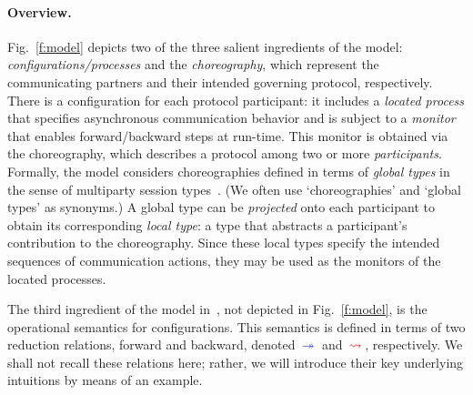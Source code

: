 \documentclass[runningheads,plain]{llncs}
\begin{document}
\paragraph{Overview.}
Fig.~\ref{f:model} depicts two of the three salient ingredients of the model:
\emph{configurations/processes} and the
\emph{choreography}, which represent the communicating partners and their intended governing protocol, respectively. 
There is a {configuration} for each protocol participant: it includes a \emph{located process} that specifies asynchronous communication behavior and is subject to a \emph{monitor} that enables forward/backward steps at run-time. This monitor is obtained via the choreography, which describes a protocol among two or more \emph{participants}. 
Formally, the model considers choreographies defined in terms of \emph{global types} in the sense of multiparty session types~\cite{DBLP:conf/popl/HondaYC08}. 
(We often use `choreographies' and `global types' as synonyms.)
A global type can be \emph{projected} onto each participant to obtain 
its corresponding  \emph{local type}: a type that abstracts a participant's contribution to the choreography. Since these local types specify the intended sequences of communication actions, they may be used as the monitors of the located processes. 

The third ingredient of the model in~\cite{DBLP:conf/ppdp/MezzinaP17}, not depicted in Fig.~\ref{f:model}, is the operational semantics for configurations. This semantics is defined in terms of two reduction relations, forward and backward, denoted $\textcolor{blue}{\,\twoheadrightarrow\,}$  and $\textcolor{red}{\,\rightsquigarrow\,}$, respectively. We shall not recall these relations here; rather, we will introduce their key underlying intuitions by means of an example.
\end{document}
